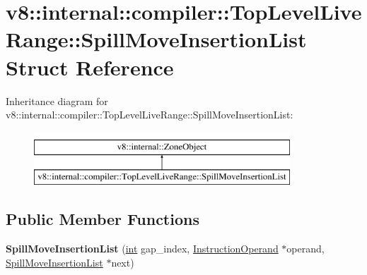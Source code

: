 \hypertarget{structv8_1_1internal_1_1compiler_1_1TopLevelLiveRange_1_1SpillMoveInsertionList}{}\section{v8\+:\+:internal\+:\+:compiler\+:\+:Top\+Level\+Live\+Range\+:\+:Spill\+Move\+Insertion\+List Struct Reference}
\label{structv8_1_1internal_1_1compiler_1_1TopLevelLiveRange_1_1SpillMoveInsertionList}
Inheritance diagram for v8\+:\+:internal\+:\+:compiler\+:\+:Top\+Level\+Live\+Range\+:\+:Spill\+Move\+Insertion\+List\+:\begin{figure}[H]
\begin{center}
\leavevmode
\includegraphics[height=2.000000cm]{structv8_1_1internal_1_1compiler_1_1TopLevelLiveRange_1_1SpillMoveInsertionList}
\end{center}
\end{figure}
\subsection*{Public Member Functions}
\begin{DoxyCompactItemize}
\item 
\mbox{\label{structv8_1_1internal_1_1compiler_1_1TopLevelLiveRange_1_1SpillMoveInsertionList_a7343b7c347ce74fcaf32ccb3e6d2c35d}} 
{\bfseries Spill\+Move\+Insertion\+List} (\mbox{\hyperlink{classint}{int}} gap\+\_\+index, \mbox{\hyperlink{classv8_1_1internal_1_1compiler_1_1InstructionOperand}{Instruction\+Operand}} $\ast$operand, \mbox{\hyperlink{structv8_1_1internal_1_1compiler_1_1TopLevelLiveRange_1_1SpillMoveInsertionList}{Spill\+Move\+Insertion\+List}} $\ast$next)
\end{DoxyCompactItemize}
